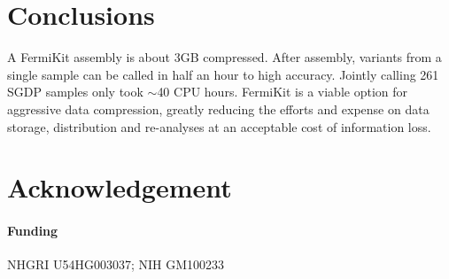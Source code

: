 \documentclass{bioinfo}
\begin{document}
\section{Conclusions}

A FermiKit assembly is about 3GB compressed. After assembly, variants from a
single sample can be called in half an hour to high accuracy. Jointly calling
261 SGDP samples only took $\sim$40 CPU hours.  FermiKit is a viable option for
aggressive data compression, greatly reducing the efforts and expense on data
storage, distribution and re-analyses at an acceptable cost of information
loss.

\section*{Acknowledgement}
\paragraph{Funding\textcolon} NHGRI U54HG003037; NIH GM100233


\end{document}
